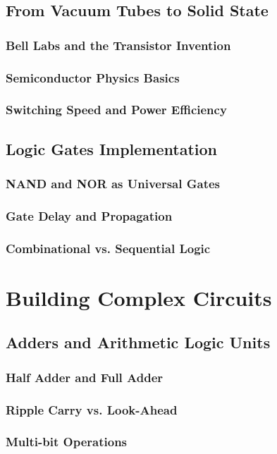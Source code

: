 \documentclass[12pt, oneside]{book}
\begin{document}
\subsection{From Vacuum Tubes to Solid State}
\subsubsection{Bell Labs and the Transistor Invention}
\subsubsection{Semiconductor Physics Basics}
\subsubsection{Switching Speed and Power Efficiency}

\subsection{Logic Gates Implementation}
\subsubsection{NAND and NOR as Universal Gates}
\subsubsection{Gate Delay and Propagation}
\subsubsection{Combinational vs. Sequential Logic}

\section{Building Complex Circuits}
\subsection{Adders and Arithmetic Logic Units}
\subsubsection{Half Adder and Full Adder}
\subsubsection{Ripple Carry vs. Look-Ahead}
\subsubsection{Multi-bit Operations}
\end{document}
